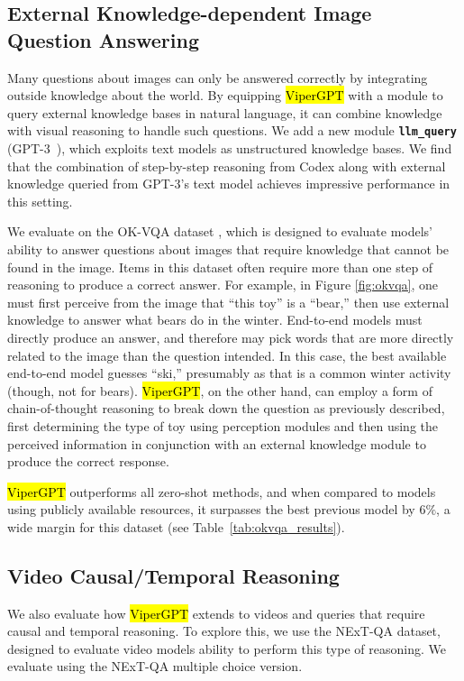 \documentclass[10pt,twocolumn,letterpaper]{article}
\newcommand{\viper}[0]{{\small\fontfamily{txtt}\selectfont \textcolor{mygreen}{\hl{ViperGPT}}}\xspace}
\begin{document}
\subsection{External Knowledge-dependent Image Question Answering}

Many questions about images can only be answered correctly by integrating outside knowledge about the world. By equipping \viper with a module to query external knowledge bases in natural language, it can combine knowledge with visual reasoning to handle such questions. We add a new module \texttt{\textbf{llm\_query}} ({\footnotesize GPT-3~\cite{brown_language_2020}}), which exploits text models as unstructured knowledge bases. We find that the combination of step-by-step reasoning from Codex along with external knowledge queried from \mbox{GPT-3}'s text model achieves impressive performance in this setting.

We evaluate on the OK-VQA dataset \cite{marino_ok-vqa_2019}, which is designed to evaluate models' ability to answer questions about images that require knowledge that cannot be found in the image. Items in this dataset often require more than one step of reasoning to produce a correct answer. For example, in Figure \ref{fig:okvqa}, one must first perceive from the image that ``this toy'' is a ``bear,'' then use external knowledge to answer what bears do in the winter. End-to-end models must directly produce an answer, and therefore may pick words that are more directly related to the image than the question intended. In this case, the best available end-to-end model guesses ``ski,'' presumably as that is a common winter activity (though, not for bears). \viper, on the other hand, can employ a form of chain-of-thought reasoning \cite{wei_chain_2022} to break down the question as previously described, first determining the type of toy using perception modules and then using the perceived information in conjunction with an external knowledge module to produce the correct response.

\viper outperforms all zero-shot methods, and when compared to models using publicly available resources, it surpasses the best previous model by $6\%$, a wide margin for this dataset (see Table~\ref{tab:okvqa_results}).

\subsection{Video Causal/Temporal Reasoning}

We also evaluate how \viper extends to videos and queries that require causal and temporal reasoning. To explore this, we use the NExT-QA dataset, designed to evaluate video models ability to perform this type of reasoning. 
We evaluate using the NExT-QA multiple choice version.
\end{document}

